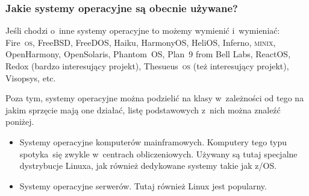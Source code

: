 \documentclass[10pt,t]{beamer}
\begin{document}
\begin{frame}
  \frametitle{Jakie systemy operacyjne są obecnie używane?}


  Jeśli chodzi o~inne systemy operacyjne to możemy wymienić i~wymieniać:
  Fire~\textsc{os}, FreeBSD, FreeDOS, Haiku, HarmonyOS, HeliOS,
  Inferno, \textsc{minix}, OpenHarmony, OpenSolaris, Phantom~OS, Plan~9
  from Bell Labs, ReactOS, Redox (bardzo interesujący projekt),
  Thesueus~\textsc{os} (też interesujący projekt), Visopsys, etc.

  Poza tym, systemy operacyjne można podzielić na klasy w~zależności od
  tego na jakim sprzęcie mają one działać, listę podstawowych z~nich można
  znaleźć poniżej.

  \begin{itemize}

  \item Systemy operacyjne komputerów mainframowych. Komputery tego typu
    spotyka~się zwykle w~centrach obliczeniowych. Używany są tutaj specjalne
    dystrybucje Linuxa, jak również dedykowane systemy takie jak z/OS.



  \item Systemy operacyjne serwerów. Tutaj również Linux jest popularny.

  \end{itemize}

\end{frame}
\end{document}
